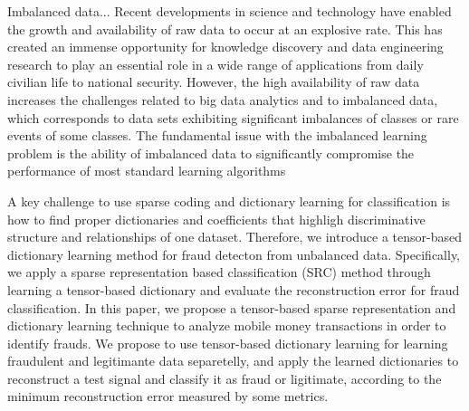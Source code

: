 Imbalanced data...
Recent developments in science and technology have enabled the growth and availability of raw data to occur at an explosive rate. This has created an immense opportunity for knowledge discovery and data engineering research to play an essential role in a wide range of applications from daily civilian life to national security. However, the high availability of raw data increases the challenges related to big data analytics and to imbalanced data, which corresponds to data sets exhibiting significant imbalances of classes or rare events of some classes. The fundamental issue with the imbalanced learning problem is the ability of imbalanced data to significantly compromise the performance of most standard learning algorithms

A key challenge to use sparse coding and dictionary learning for classification is how to find proper dictionaries and coefficients that highligh discriminative structure and relationships of one dataset. Therefore, we introduce a tensor-based dictionary learning method for fraud detecton from unbalanced data. Specifically, we apply a sparse representation based classification (SRC) method through learning a tensor-based dictionary and evaluate the reconstruction error for fraud classification. In this paper, we propose a tensor-based sparse representation and dictionary learning technique to analyze mobile money transactions in order to identify frauds. We propose to use tensor-based dictionary learning for learning fraudulent and legitimante data separetelly, and apply the learned dictionaries to reconstruct a test signal and classify it as fraud or ligitimate, according to the minimum reconstruction error measured by some metrics.


